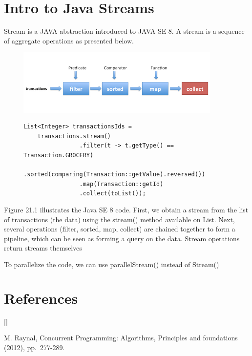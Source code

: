 \documentclass[twoside]{article}
\def\beginrefs{\begin{list}%
        {[\arabic{equation}]}{\usecounter{equation}
         \setlength{\leftmargin}{2.0truecm}\setlength{\labelsep}{0.4truecm}%
         \setlength{\labelwidth}{1.6truecm}}}
\def\endrefs{\end{list}}
\def\bibentry#1{\item[\hbox{[#1]}]}
\begin{document}
\section{Intro to Java Streams}
Stream is a JAVA abstraction introduced to JAVA SE 8. 
A stream is a sequence of aggregate operations as presented below.
\begin{figure}[h]
\caption{}
\centering
\includegraphics[width=0.9\textwidth]{2179048.png}
\begin{lstlisting}
List<Integer> transactionsIds = 
    transactions.stream()
                .filter(t -> t.getType() == Transaction.GROCERY)
                .sorted(comparing(Transaction::getValue).reversed())
                .map(Transaction::getId)
                .collect(toList());
\end{lstlisting}
\end{figure}

Figure 21.1 illustrates the Java SE 8 code. First, we obtain a stream from the list of transactions (the data) using the stream() method available on List. Next, several operations (filter, sorted, map, collect) are chained together to form a pipeline, which can be seen as forming a query on the data. Stream operations return streams themselves

To parallelize the code, we can use parallelStream() instead of Stream()



\section*{References}
\beginrefs

\bibentry{R12}{\sc M. Raynal}, Concurrent Programming: Algorithms, Principles and foundations (2012), 
pp.~277-289.
\endrefs
\end{document}
